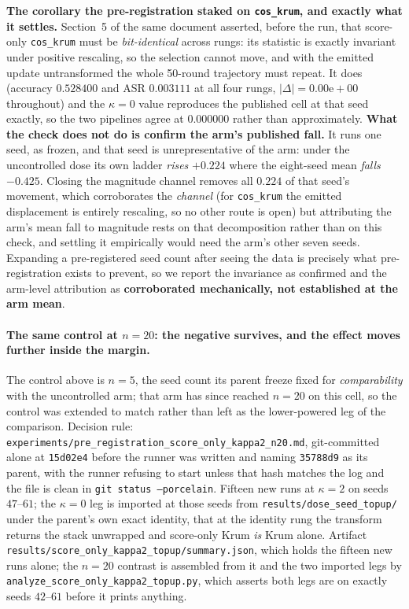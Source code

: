 \documentclass{article}
\begin{document}
\textbf{The corollary the pre-registration staked on \texttt{cos\_krum}, and exactly what it settles.} Section~5 of the same document asserted, before the run, that score-only \texttt{cos\_krum} must be \emph{bit-identical} across rungs: its statistic is exactly invariant under positive rescaling, so the selection cannot move, and with the emitted update untransformed the whole 50-round trajectory must repeat. It does (accuracy $0.528400$ and ASR $0.003111$ at all four rungs, $|\Delta| = 0.00\mathrm{e}{+}00$ throughout) and the $\kappa{=}0$ value reproduces the published cell at that seed exactly, so the two pipelines agree at $0.000000$ rather than approximately. \textbf{What the check does not do is confirm the arm's published fall.} It runs one seed, as frozen, and that seed is unrepresentative of the arm: under the uncontrolled dose its own ladder \emph{rises} $+0.224$ where the eight-seed mean \emph{falls} $-0.425$. Closing the magnitude channel removes all $0.224$ of that seed's movement, which corroborates the \emph{channel} (for \texttt{cos\_krum} the emitted displacement is entirely rescaling, so no other route is open) but attributing the arm's mean fall to magnitude rests on that decomposition rather than on this check, and settling it empirically would need the arm's other seven seeds. Expanding a pre-registered seed count after seeing the data is precisely what pre-registration exists to prevent, so we report the invariance as confirmed and the arm-level attribution as \textbf{corroborated mechanically, not established at the arm mean}.

\paragraph{The same control at $n{=}20$: the negative survives, and the effect moves further inside the margin.}
\label{app:score_only_n20}
The control above is $n{=}5$, the seed count its parent freeze fixed for \emph{comparability} with the uncontrolled arm; that arm has since reached $n{=}20$ on this cell, so the control was extended to match rather than left as the lower-powered leg of the comparison. Decision rule: \texttt{experiments/\allowbreak pre\_registration\_\allowbreak score\_only\_\allowbreak kappa2\_\allowbreak n20.md}, git-committed alone at \texttt{15d02e4} before the runner was written and naming \texttt{35788d9} as its parent, with the runner refusing to start unless that hash matches the log and the file is clean in \texttt{git status --porcelain}. Fifteen new runs at $\kappa{=}2$ on seeds $47$--$61$; the $\kappa{=}0$ leg is imported at those seeds from \texttt{results/\allowbreak dose\_seed\_topup/} under the parent's own exact identity, that at the identity rung the transform returns the stack unwrapped and score-only Krum \emph{is} Krum alone. Artifact \texttt{results/\allowbreak score\_only\_\allowbreak kappa2\_\allowbreak topup/\allowbreak summary.json}, which holds the fifteen new runs alone; the $n{=}20$ contrast is assembled from it and the two imported legs by \texttt{analyze\_score\_only\_kappa2\_topup.py}, which asserts both legs are on exactly seeds $42$--$61$ before it prints anything.
\end{document}
